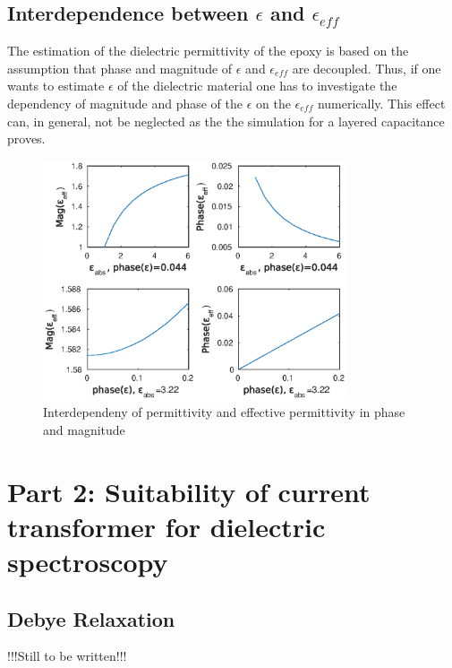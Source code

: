 \subsection{Interdependence between $\epsilon$ and $\epsilon_{eff}$} 
The estimation of the dielectric permittivity of the epoxy is based on the assumption that phase and magnitude of $\epsilon$ and $\epsilon_{eff}$ are decoupled. Thus, if one wants to estimate $\epsilon$ of the dielectric material one has to investigate the dependency of magnitude and phase of the $\epsilon$ on the $\epsilon_{eff}$ numerically. This effect can, in general, not be neglected as the the simulation for a layered capacitance proves.  
\begin{figure}

	\includegraphics[width=0.8\textwidth]{figures/Theory/layeredepsilon.eps}
	\caption[Kurze Abbildungsbeschreibung]{Interdependeny of permittivity and effective permittivity in phase and magnitude}
	
\end{figure}
	
	
\section{Part 2: Suitability of current transformer for dielectric spectroscopy}
\subsection{Debye Relaxation}
!!!Still to be written!!!
